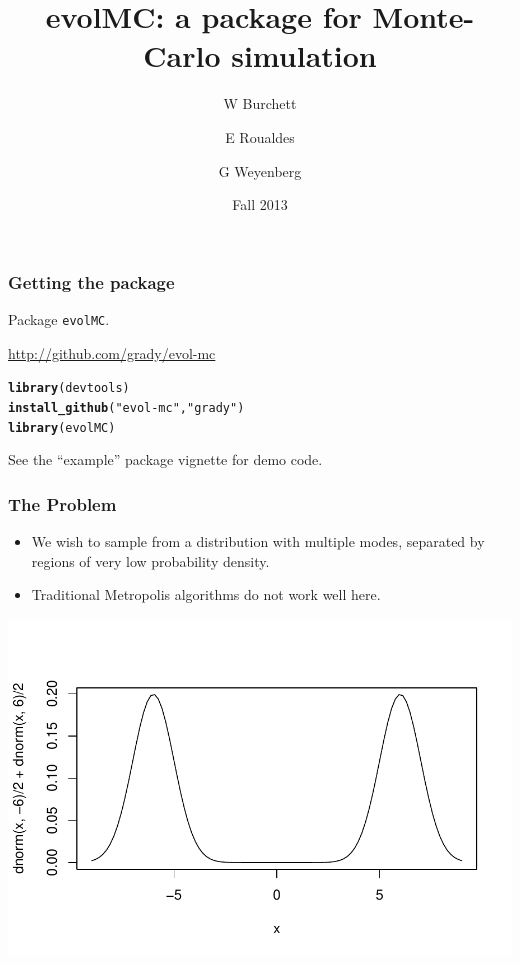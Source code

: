 \documentclass{beamer}\usepackage[]{graphicx}\usepackage[]{color}
\title{evolMC: a package for Monte-Carlo simulation}
\author{W Burchett \and E Roualdes \and G Weyenberg}
\date{Fall 2013}
\makeatletter
\newcommand{\hlstr}[1]{\textcolor[rgb]{0.192,0.494,0.8}{#1}}%
\newcommand{\hlstd}[1]{\textcolor[rgb]{0.345,0.345,0.345}{#1}}%
\newcommand{\hlkwd}[1]{\textcolor[rgb]{0.737,0.353,0.396}{\textbf{#1}}}%
\newenvironment{kframe}{%
 \def\at@end@of@kframe{}%
 \ifinner\ifhmode%
  \def\at@end@of@kframe{\end{minipage}}%
  \begin{minipage}{\columnwidth}%
 \fi\fi%
 \def\FrameCommand##1{\hskip\@totalleftmargin \hskip-\fboxsep
 \colorbox{shadecolor}{##1}\hskip-\fboxsep
     \hskip-\linewidth \hskip-\@totalleftmargin \hskip\columnwidth}%
 \MakeFramed {\advance\hsize-\width
   \@totalleftmargin\z@ \linewidth\hsize
   \@setminipage}}%
 {\par\unskip\endMakeFramed%
 \at@end@of@kframe}
\newenvironment{knitrout}{}{} %
\makeatother
\begin{document}
\begin{frame}
\maketitle
\end{frame}

\begin{frame}[fragile]
  \frametitle{Getting the package}
  Package {\tt evolMC}.
 
  \url{http://github.com/grady/evol-mc}
\begin{knitrout}
\color{fgcolor}\begin{kframe}
\begin{alltt}
\hlkwd{library}\hlstd{(devtools)}
\hlkwd{install_github}\hlstd{(}\hlstr{"evol-mc"}\hlstd{,} \hlstr{"grady"}\hlstd{)}
\hlkwd{library}\hlstd{(evolMC)}
\end{alltt}
\end{kframe}
\end{knitrout}

See the ``example'' package vignette for demo code.
\end{frame}

\begin{frame}
  \frametitle{The Problem}
  \begin{itemize}
  \item We wish to sample from a distribution with multiple modes, separated by regions of very low probability density.

    \item Traditional Metropolis algorithms do not work well here.
      

  \end{itemize}
\begin{center}
\includegraphics[scale=0.6]{figure/bimodal}  
\end{center}
\end{frame}
\end{document}
